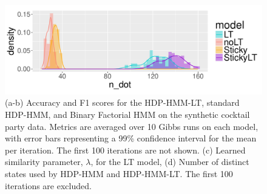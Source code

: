 \begin{figure}[tb]
\begin{minipage}{0.75\textwidth}
  \includegraphics[width = \textwidth]{fig/cocktail/synth_s16_m12/hyper_h/h10.0_nocs_cp0/a5b0p01/n_dot_density.pdf}
\end{minipage}
\caption{(a-b) Accuracy and F1 scores for the HDP-HMM-LT, standard HDP-HMM, and
    Binary Factorial HMM on
    the synthetic cocktail party data.  Metrics are averaged
  over 10 Gibbs runs on each model, with error bars representing a 99\% confidence
  interval for the mean per iteration.  The first 100 iterations are
  not shown. (c) Learned similarity parameter, $\lambda$, for the LT
  model, (d) Number of distinct states used by HDP-HMM and
  HDP-HMM-LT.  The first 100 iterations are excluded.}
  \label{fig:synth-cocktail-results}
\end{figure}

